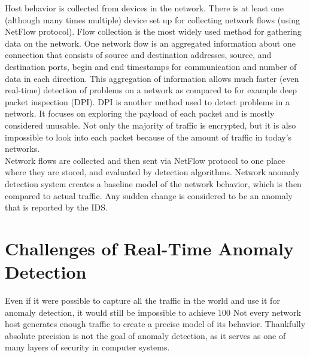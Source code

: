 \documentclass[thesis=B,english]{FITthesis}[2012/10/20]
\begin{document}
Host behavior is collected from devices in the network.                           
There is at least one (although many times multiple) device set up for collecting network flows (using NetFlow protocol).
Flow collection is the most widely used method for gathering data on the network.
One network flow is an aggregated information about one connection that consists of source and destination addresses, source, and destination ports, begin and end timestamps for communication and number of data in each direction.
This aggregation of information allows much faster (even real-time) detection of problems on a network as compared to for example deep packet inspection (DPI).
DPI is another method used to detect problems in a network.                       
It focuses on exploring the payload of each packet and is mostly considered unusable.
Not only the majority of traffic is encrypted, but it is also impossible to look into each packet because of the amount of traffic in today's networks. \\
                                                                                  
Network flows are collected and then sent via NetFlow protocol to one place where they are stored, and evaluated by detection algorithms.
Network anomaly detection system creates a baseline model of the network behavior, which is then compared to actual traffic.
Any sudden change is considered to be an anomaly that is reported by the IDS. \\  
                                                                                  
\section{Challenges of Real-Time Anomaly Detection}                               
Even if it were possible to capture all the traffic in the world and use it for anomaly detection, it would still be impossible to achieve 100%
Not every network host generates enough traffic to create a precise model of its behavior.
Thankfully absolute precision is not the goal of anomaly detection, as it serves as one of many layers of security in computer systems. \\
                                                                                  
\end{document}
